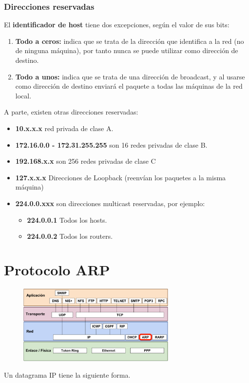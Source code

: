 \subsubsection{Direcciones reservadas}
El \textbf{identificador de host} tiene dos excepciones, según el valor de sus bits:
\begin{enumerate}
    \item \textbf{Todo a ceros:} indica que se trata de la dirección que identifica a la red (no de ninguna máquina), por tanto nunca se puede utilizar como dirección de destino.
    \item \textbf{Todo a unos:} indica que se trata de una dirección de broadcast, y al usarse como dirección de destino enviará el paquete a todas las máquinas de la red local.
\end{enumerate}
A parte, existen otras direcciones reservadas:
\begin{itemize}
  \item \textbf{10.x.x.x} red privada de clase A.
  \item \textbf{172.16.0.0 - 172.31.255.255} son 16 redes privadas de clase B.
  \item \textbf{192.168.x.x} son 256 redes privadas de clase C
  \item \textbf{127.x.x.x} Direcciones de Loopback (reenvían los paquetes a la misma máquina)
  \item \textbf{224.0.0.xxx} son direcciones multicast reservadas, por ejemplo:
  \begin{itemize}
      \item \textbf{224.0.0.1} Todos los hosts.
      \item \textbf{224.0.0.2} Todos los routers.
  \end{itemize}
\end{itemize}

\section{Protocolo ARP}
\begin{figure}[H]
    \centering
    \includegraphics[width=0.7\textwidth]{img/ARP.png}
\end{figure}
Un datagrama IP tiene la siguiente forma.

